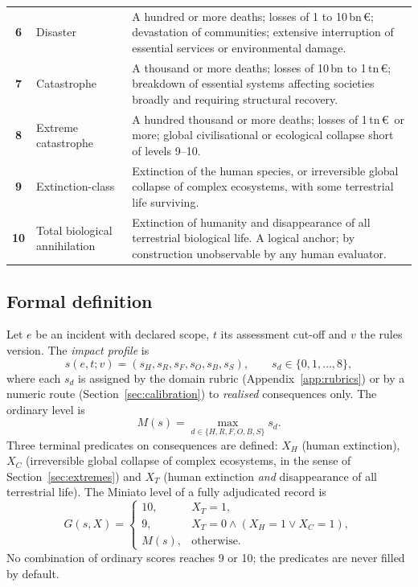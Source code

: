 \documentclass[11pt,a4paper]{article}
\newcommand{\lvl}[1]{\textsf{\textbf{#1}}}
\begin{document}
\begin{table}[ht]
\begin{tabularx}{\textwidth}{@{}c l X@{}}
\lvl{6} & Disaster & A hundred or more deaths; losses of 1 to 10\,bn\,\euro; devastation of communities; extensive interruption of essential services or environmental damage. \\
\lvl{7} & Catastrophe & A thousand or more deaths; losses of 10\,bn to 1\,tn\,\euro; breakdown of essential systems affecting societies broadly and requiring structural recovery. \\
\lvl{8} & Extreme catastrophe & A hundred thousand or more deaths; losses of 1\,tn\,\euro\ or more; global civilisational or ecological collapse short of levels 9--10. \\
\lvl{9} & Extinction-class & Extinction of the human species, or irreversible global collapse of complex ecosystems, with some terrestrial life surviving. \\
\lvl{10} & Total biological annihilation & Extinction of humanity and disappearance of all terrestrial biological life. A logical anchor; by construction unobservable by any human evaluator. \\
\bottomrule
\end{tabularx}
\end{table}

\subsection{Formal definition}
\label{sec:formal}

Let $e$ be an incident with declared scope, $t$ its assessment cut-off and $v$ the rules version. The \emph{impact profile} is
\begin{equation}
s(e,t;v) = (s_H, s_R, s_F, s_O, s_B, s_S), \qquad s_d \in \{0,1,\dots,8\},
\end{equation}
where each $s_d$ is assigned by the domain rubric (Appendix~\ref{app:rubrics}) or by a numeric route (Section~\ref{sec:calibration}) to \emph{realised} consequences only. The ordinary level is
\begin{equation}
M(s) = \max_{d\in\{H,R,F,O,B,S\}} s_d .
\label{eq:max}
\end{equation}
Three terminal predicates on consequences are defined: $X_H$ (human extinction), $X_C$ (irreversible global collapse of complex ecosystems, in the sense of Section~\ref{sec:extremes}) and $X_T$ (human extinction \emph{and} disappearance of all terrestrial life). The Miniato level of a fully adjudicated record is
\begin{equation}
G(s,X) =
\begin{cases}
10, & X_T = 1,\\
9, & X_T = 0 \wedge (X_H = 1 \vee X_C = 1),\\
M(s), & \text{otherwise.}
\end{cases}
\label{eq:G}
\end{equation}
No combination of ordinary scores reaches 9 or 10; the predicates are never filled by default.
\end{document}
